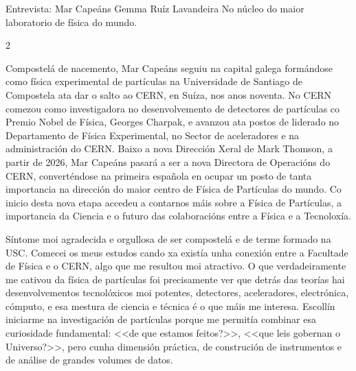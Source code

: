 \Artigo*%
{entrevistas}%
{Entrevista: Mar Capeáns}%
{Gemma Ruíz Lavandeira}%
{No núcleo do maior laboratorio de física do mundo.}%

\begin{multicols}{2}

Compostelá de nacemento, Mar Capeáns seguiu na capital galega formándose como
física experimental de partículas na Universidade de Santiago de Compostela ata
dar o salto ao CERN, en Suíza, nos anos noventa. No CERN comezou como
investigadora no desenvolvemento de detectores de partículas co Premio Nobel de
Física, Georges Charpak, e avanzou ata postos de liderado no Departamento de
Física Experimental, no Sector de aceleradores e na administración do CERN.
Baixo a nova Dirección Xeral de Mark Thomson, a partir de 2026, Mar Capeáns
pasará a ser a nova Directora de Operacións do CERN, converténdose na primeira
española en ocupar un posto de tanta importancia na dirección do maior centro
de Física de Partículas do mundo. Co inicio desta nova etapa accedeu a
contarnos máis sobre a Física de Partículas, a importancia da Ciencia e o
futuro das colaboracións entre a Física e a Tecnoloxía.

\textcolor{Resalte}{\hrulefill}


Síntome moi agradecida e orgullosa de ser compostelá e de terme formado na USC.
Comecei os meus estudos cando xa existía unha conexión entre a Facultade de
Física e o CERN, algo que me resultou moi atractivo. O que verdadeiramente me
cativou da física de partículas foi precisamente ver que detrás das teorías hai
desenvolvementos tecnolóxicos moi potentes, detectores, aceleradores,
electrónica, cómputo, e esa mestura de ciencia e técnica é o que máis me
interesa. Escollín iniciarme na investigación de partículas porque me permitía
combinar esa curiosidade fundamental: <<de que estamos feitos?>>, <<que leis
gobernan o Universo?>>, pero cunha dimensión práctica, de construción de
instrumentos e de análise de grandes volumes de datos.



\end{multicols}
